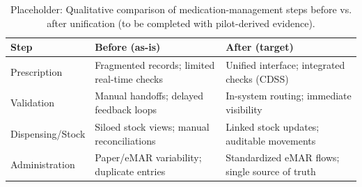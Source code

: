 \begin{table}[H]
    \centering
    \caption{Placeholder: Qualitative comparison of medication-management steps before vs. after unification (to be completed with pilot-derived evidence).}
    \label{tab:before_after_qualitative}
    \begin{tabularx}{\textwidth}{@{}l|X|X@{}}
        \toprule
        \textbf{Step} & \textbf{Before (as-is)} & \textbf{After (target)} \\
        \midrule
        Prescription & Fragmented records; limited real-time checks & Unified interface; integrated checks (CDSS) \\
        Validation & Manual handoffs; delayed feedback loops & In-system routing; immediate visibility \\
        Dispensing/Stock & Siloed stock views; manual reconciliations & Linked stock updates; auditable movements \\
        Administration & Paper/eMAR variability; duplicate entries & Standardized eMAR flows; single source of truth \\
        \bottomrule
    \end{tabularx}
\end{table}


